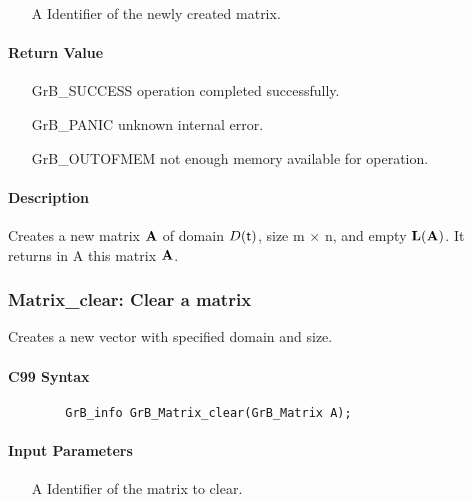\begin{itemize}[leftmargin=1.1in]
    \item[{\sf A}] Identifier of the newly created matrix.
\end{itemize}

\paragraph{Return Value}

\begin{itemize}[leftmargin=2.1in]
\item[{\sf GrB\_SUCCESS}]   operation completed successfully.
\item[{\sf GrB\_PANIC}]     unknown internal error.
\item[{\sf GrB\_OUTOFMEM}]  not enough memory available for operation.
\end{itemize}

\paragraph{Description}

Creates a new matrix ${\bf A}$ of domain $D({\sf t})$, size {\sf m $\times$ n}, and
empty $\bold{L}({\bf A})$. It returns in {\sf A} this matrix ${\bf A}$.

\subsubsection{{\sf Matrix\_clear}: Clear a matrix}

Creates a new vector with specified domain and size.

\paragraph{C99 Syntax}

\begin{verbatim}
        GrB_info GrB_Matrix_clear(GrB_Matrix A);
\end{verbatim}

\paragraph{Input Parameters}

\begin{itemize}[leftmargin=1.1in]
    \item[{\sf A}] Identifier of the matrix to clear.
\end{itemize}

